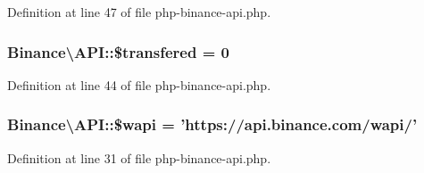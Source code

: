 Definition at line 47 of file php-\/binance-\/api.\-php.

\hypertarget{classBinance_1_1API_ac40776b871ae1591348c96162e872789}{
\subsubsection[{\$transfered}]{\setlength{\rightskip}{0pt plus 5cm}Binance\textbackslash{}\-A\-P\-I\-::\$transfered = 0\hspace{0.3cm}{\ttfamily [protected]}}}\label{classBinance_1_1API_ac40776b871ae1591348c96162e872789}


Definition at line 44 of file php-\/binance-\/api.\-php.

\hypertarget{classBinance_1_1API_a52a5376574ff759fb1df6c8efe24cb7f}{
\subsubsection[{\$wapi}]{\setlength{\rightskip}{0pt plus 5cm}Binance\textbackslash{}\-A\-P\-I\-::\$wapi = 'https\-://api.\-binance.\-com/wapi/'\hspace{0.3cm}{\ttfamily [protected]}}}\label{classBinance_1_1API_a52a5376574ff759fb1df6c8efe24cb7f}


Definition at line 31 of file php-\/binance-\/api.\-php.


